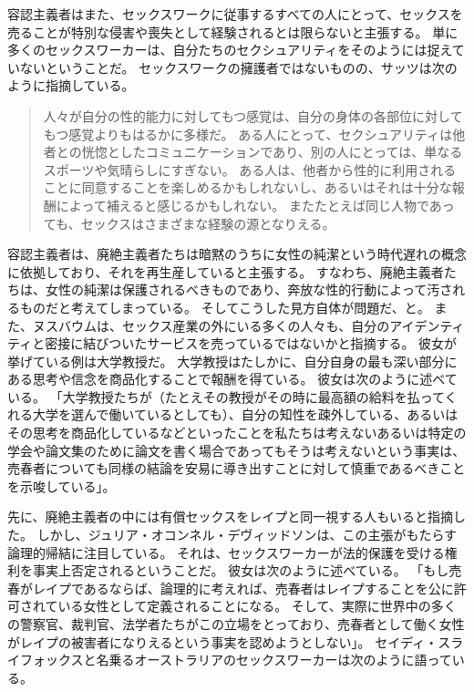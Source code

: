 \documentclass[paper=a4,book,openany]{jlreq} \usepackage{mystyle}
\begin{document}
容認主義者はまた、セックスワークに従事するすべての人にとって、セックスを売ることが特別な侵害や喪失として経験されるとは限らないと主張する。
単に多くのセックスワーカーは、自分たちのセクシュアリティをそのようには捉えていないということだ。
セックスワークの擁護者ではないものの、サッツは次のように指摘している。

\begin{quote}
人々が自分の性的能力に対してもつ感覚は、自分の身体の各部位に対してもつ感覚よりもはるかに多様だ。
ある人にとって、セクシュアリティは他者との恍惚としたコミュニケーションであり、別の人にとっては、単なるスポーツや気晴らしにすぎない。
ある人は、他者から性的に利用されることに同意することを楽しめるかもしれないし、あるいはそれは十分な報酬によって補えると感じるかもしれない。
またたとえば同じ人物であっても、セックスはさまざまな経験の源となりえる。
\citep[p.71]{satz95:_market_women_sexual_labor}
\end{quote}

容認主義者は、廃絶主義者たちは暗黙のうちに女性の純潔という時代遅れの概念に依拠しており、それを再生産していると主張する。
すなわち、廃絶主義者たちは、女性の純潔は保護されるべきものであり、奔放な性的行動によって汚されるものだと考えてしまっている。
そしてこうした見方自体が問題だ、と。
また、ヌスバウムは、セックス産業の外にいる多くの人々も、自分のアイデンティティと密接に結びついたサービスを売っているではないかと指摘する。
彼女が挙げている例は大学教授だ。
大学教授はたしかに、自分自身の最も深い部分にある思考や信念を商品化することで報酬を得ている。
彼女は次のように述べている。
「大学教授たちが（たとえその教授がその時に最高額の給料を払ってくれる大学を選んで働いているとしても）、自分の知性を疎外している、あるいはその思考を商品化しているなどといったことを私たちは考えない{\DDASH}あるいは特定の学会や論文集のために論文を書く場合であってもそうは考えない{\DDASH}という事実は、売春者についても同様の結論を安易に導き出すことに対して慎重であるべきことを示唆している」\citep[p.704]{nussbaum98:_wheth_reason_prejud}。

先に、廃絶主義者の中には有償セックスをレイプと同一視する人もいると指摘した。
しかし、ジュリア・オコンネル・デヴィッドソンは、この主張がもたらす論理的帰結に注目している。
それは、セックスワーカーが法的保護を受ける権利を事実上否定されるということだ。
彼女は次のように述べている。
「もし売春がレイプであるならば、論理的に考えれば、売春者はレイプすることを公に許可されている女性として定義されることになる。
そして、実際に世界中の多くの警察官、裁判官、法学者たちがこの立場をとっており、売春者として働く女性がレイプの被害者になりえるという事実を認めようとしない」\citep[p.122]{davidson98:_prost_power_freed}。
セイディ・スライフォックスと名乗るオーストラリアのセックスワーカーは次のように語っている。
\end{document}
